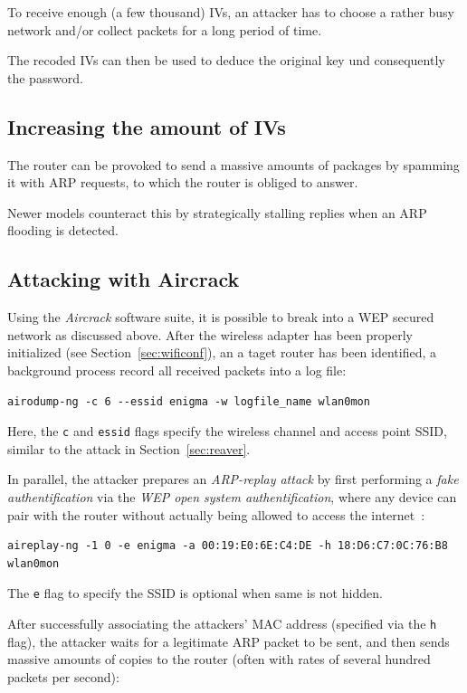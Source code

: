 To receive enough (a few thousand) IVs, an attacker has to choose a rather busy network and/or collect packets for a long period of time.

The recoded IVs can then be used to deduce the original key und consequently the password.

\subsection{Increasing the amount of IVs}

The router can be provoked to send a massive amounts of packages by spamming it with ARP requests, to which the router is obliged to answer.

Newer models counteract this by strategically stalling replies when an ARP flooding is detected.

\subsection{Attacking with Aircrack}\label{sec:wepcrack}

Using the \emph{Aircrack} software suite, it is possible to break into a WEP secured network as discussed above. After the wireless adapter has been properly initialized (see Section~\ref{sec:wificonf}), an a taget router has been identified, a background process record all received packets into a log file:

\begin{lstlisting}
airodump-ng -c 6 --essid enigma -w logfile_name wlan0mon
\end{lstlisting}

Here, the \lstinline{c} and \lstinline{essid} flags specify the wireless channel and access point SSID, similar to the attack in Section~\ref{sec:reaver}.

In parallel, the attacker prepares an \emph{ARP-replay attack} by first performing a \emph{fake authentification} via the \emph{WEP open system authentification}, where any device can pair with the router without actually being allowed to access the internet~\cite{WiFi16}:

\begin{lstlisting}
aireplay-ng -1 0 -e enigma -a 00:19:E0:6E:C4:DE -h 18:D6:C7:0C:76:B8 wlan0mon
\end{lstlisting}

The \lstinline{e} flag to specify the SSID is optional when same is not hidden.

After successfully associating the attackers' MAC address (specified via the \lstinline{h} flag), the attacker waits for a legitimate ARP packet to be sent, and then sends massive amounts of copies to the router (often with rates of several hundred packets per second):

